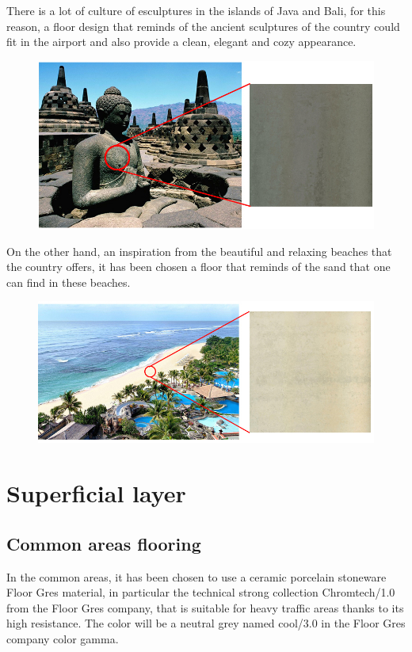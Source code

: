 	There is a lot of culture of esculptures in the islands of Java and Bali, for this reason, a floor design that reminds of the ancient sculptures of the country could fit in the airport and also provide a clean, elegant and cozy appearance.
	
	\begin{figure}[ht!]
	\centering
\includegraphics[width=13cm]{./images/SueloGeneral}
\end{figure}

On the other hand, an inspiration from the beautiful and relaxing beaches that the country offers, it has been chosen a floor that reminds of the sand that one can find in these beaches.

\begin{figure}[ht!]
	\centering
\includegraphics[width=15cm]{./images/SueloSecundario}
\end{figure}

	
	
	
	\section{Superficial layer}
		\subsection{Common areas flooring}
	In the common areas, it has been chosen to use a ceramic porcelain stoneware Floor Gres material, in particular the technical strong collection Chromtech/1.0 from the Floor Gres company, that is suitable for heavy traffic areas thanks to its high resistance. The color will be a neutral grey named cool/3.0 in the Floor Gres company color gamma.
	
